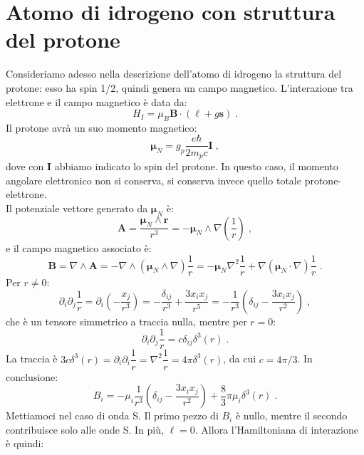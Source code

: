 \documentclass[12pt,a4paper]{report}
\theoremstyle{definition}
\numberwithin{equation}{section}
\begin{document}
\section{Atomo di idrogeno con struttura del protone}
Consideriamo adesso nella descrizione dell'atomo di idrogeno la struttura del protone: esso ha spin 1/2, quindi genera un campo magnetico. L'interazione tra elettrone e il campo magnetico è data da:
\begin{equation}
H_I=\mu_B\mathbf{B}\cdot(\boldsymbol{\ell}+g\mathbf{s})\;.
\end{equation}
Il protone avrà un suo momento magnetico:
\begin{equation}
\boldsymbol{\mu}_N=g_p\frac{e\hbar}{2m_pc}\mathbf{I}\;,
\end{equation}
dove con $\mathbf{I}$ abbiamo indicato lo spin del protone. In questo caso, il momento angolare elettronico non si conserva, si conserva invece quello totale protone-elettrone.\\
Il potenziale vettore generato da $\boldsymbol{\mu}_N$ è:
\begin{equation}
\mathbf{A}=\frac{\boldsymbol{\mu}_N\wedge \mathbf{r}}{r^3}=-\boldsymbol{\mu}_N\wedge\nabla\left(\frac{1}{r}\right)\;,
\end{equation}
e il campo magnetico associato è:
\begin{equation}
\mathbf{B}=\nabla\wedge\mathbf{A}=-\nabla\wedge(\boldsymbol{\mu}_N\wedge\nabla)\frac{1}{r}=-\boldsymbol{\mu}_N\nabla^2\frac{1}{r}+\nabla(\boldsymbol{\mu}_N\cdot\nabla)\frac{1}{r}\;.
\end{equation}
Per $r\ne 0$:
\begin{equation}
\partial_i\partial_j\frac{1}{r}=\partial_i\left(-\frac{x_j}{r^3}\right)=-\frac{\delta_{ij}}{r^3}+\frac{3x_ix_j}{r^5}=-\frac{1}{r^3}\left(\delta_{ij}-\frac{3x_ix_j}{r^2}\right)\;,
\end{equation}
che è un tensore simmetrico a traccia nulla, mentre per $r=0$:
\begin{equation}
\partial_i\partial_j\frac{1}{r}=c\delta_{ij}\delta^3(r)\;.
\end{equation}
La traccia è $3c\delta^3(r)=\partial_i\partial_i\dfrac{1}{r}=\nabla^2\dfrac{1}{r}=4\pi\delta^3(r)$, da cui $c=4\pi/3$. In conclusione:
\begin{equation}
B_i=-\mu_i\frac{1}{r^3}\left(\delta_{ij}-\frac{3x_ix_j}{r^2}\right)+\frac{8}{3}\pi\mu_i\delta^3(r)\;.
\end{equation}
Mettiamoci nel caso di onda S. Il primo pezzo di $B_i$ è nullo, mentre il secondo contribuisce solo alle onde S. In più, $\boldsymbol{\ell}=0$. Allora l'Hamiltoniana di interazione è quindi:
\end{document}
